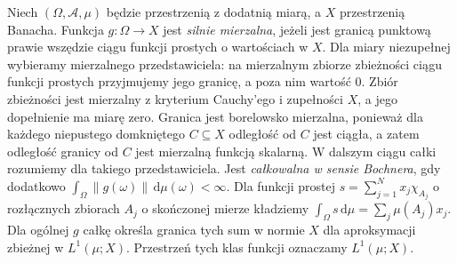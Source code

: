 \begin{definicja}
\label{def:bochner-30}
Niech $(\Omega,\mathcal A,\mu)$ będzie przestrzenią
z dodatnią miarą, a $X$ przestrzenią Banacha.
Funkcja $g:\Omega\to X$ jest \emph{silnie mierzalna},
jeżeli jest granicą punktową prawie wszędzie ciągu
funkcji prostych o wartościach w $X$.
Dla miary niezupełnej wybieramy mierzalnego przedstawiciela:
na mierzalnym zbiorze zbieżności ciągu funkcji prostych
przyjmujemy jego granicę, a poza nim wartość $0$.
Zbiór zbieżności jest mierzalny z kryterium Cauchy'ego
i zupełności $X$, a jego dopełnienie ma miarę zero.
Granica jest borelowsko mierzalna, ponieważ dla każdego
niepustego domkniętego $C\subseteq X$ odległość od $C$
jest ciągła, a zatem odległość granicy od $C$ jest
mierzalną funkcją skalarną. W dalszym ciągu całki
rozumiemy dla takiego przedstawiciela.
Jest \emph{całkowalna w sensie Bochnera}, gdy dodatkowo
$\int_\Omega\|g(\omega)\|\,\mathrm d\mu(\omega)<\infty$.
Dla funkcji prostej $s=\sum_{j=1}^{N}x_j\chi_{A_j}$
o rozłącznych zbiorach $A_j$ o skończonej mierze
kładziemy $\int_\Omega s\,\mathrm d\mu=\sum_j\mu(A_j)x_j$.
Dla ogólnej $g$ całkę określa granica tych sum
w normie $X$ dla aproksymacji zbieżnej w
$L^1(\mu;X)$. Przestrzeń tych klas funkcji
oznaczamy $L^1(\mu;X)$.
\end{definicja}

